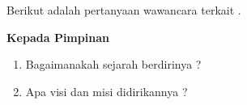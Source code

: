 %
%
%


\vspace{.5cm}

Berikut adalah pertanyaan wawancara terkait \judul.

\textbf{Kepada Pimpinan}

\begin{enumerate}
    \item Bagaimanakah sejarah berdirinya \lokus?
    \item Apa visi dan misi didirikannya \lokus?
\end{enumerate}
